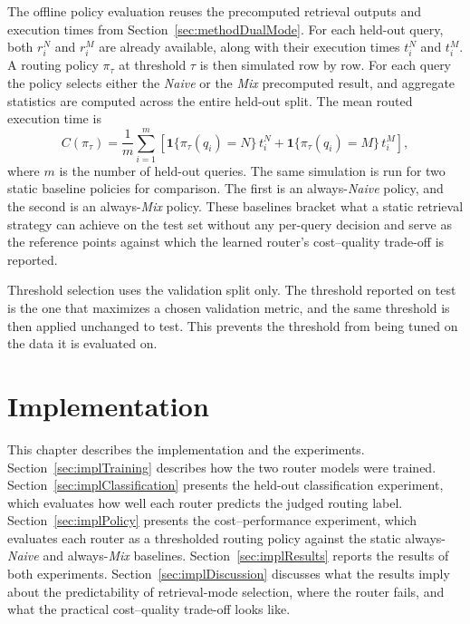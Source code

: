 \documentclass[english, bibtex]{kththesis}               %
\numberwithin{listing}{chapter}
\begin{document}
The offline policy evaluation reuses the precomputed retrieval outputs and execution times from Section~\ref{sec:methodDualMode}. For each held-out query, both \(r_i^N\) and \(r_i^M\) are already available, along with their execution times \(t_i^N\) and \(t_i^M\). A routing policy \(\pi_\tau\) at threshold \(\tau\) is then simulated row by row. For each query the policy selects either the \emph{Naive} or the \emph{Mix} precomputed result, and aggregate statistics are computed across the entire held-out split. The mean routed execution time is
\begin{equation}
\label{eq:averageRoutedTime}
C(\pi_\tau) =
\frac{1}{m}\sum_{i=1}^{m}
\left[
\mathbf{1}\{\pi_\tau(q_i)=N\}\,t_i^N
+ \mathbf{1}\{\pi_\tau(q_i)=M\}\,t_i^M
\right],
\end{equation}
where \(m\) is the number of held-out queries. The same simulation is run for two static baseline policies for comparison. The first is an always-\emph{Naive} policy, and the second is an always-\emph{Mix} policy. These baselines bracket what a static retrieval strategy can achieve on the test set without any per-query decision and serve as the reference points against which the learned router's cost--quality trade-off is reported.

Threshold selection uses the validation split only. The threshold reported on test is the one that maximizes a chosen validation metric, and the same threshold is then applied unchanged to test. This prevents the threshold from being tuned on the data it is evaluated on.

\cleardoublepage
\chapter{Implementation}
\label{ch:implementation}

This chapter describes the implementation and the experiments. Section~\ref{sec:implTraining} describes how the two router models were trained. Section~\ref{sec:implClassification} presents the held-out classification experiment, which evaluates how well each router predicts the judged routing label. Section~\ref{sec:implPolicy} presents the cost--performance experiment, which evaluates each router as a thresholded routing policy against the static always-\emph{Naive} and always-\emph{Mix} baselines. Section~\ref{sec:implResults} reports the results of both experiments. Section~\ref{sec:implDiscussion} discusses what the results imply about the predictability of retrieval-mode selection, where the router fails, and what the practical cost--quality trade-off looks like.
\end{document}
